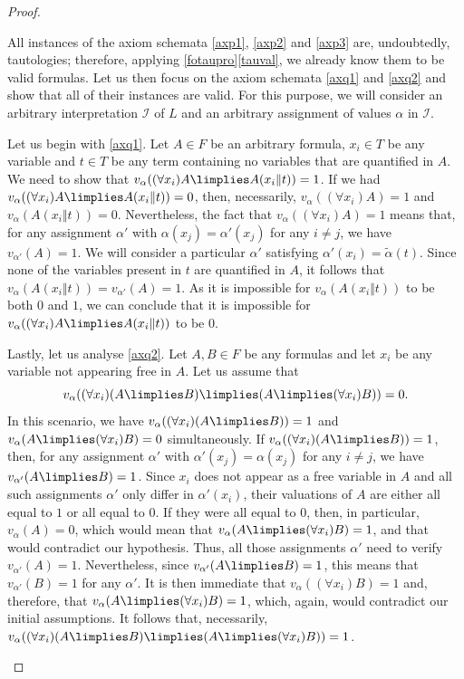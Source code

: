 \begin{proof}
\begin{parlist}
\item All instances of the axiom schemata \ref{axp1}, \ref{axp2} and \ref{axp3} are, undoubtedly, tautologies; therefore, applying \ref{fotaupro}\ref{tauval}, we already know them to be valid formulas.
Let us then focus on the axiom schemata \ref{axq1} and \ref{axq2} and show that all of their instances are valid.
For this purpose, we will consider an arbitrary interpretation $\mathcal{I}$ of $L$ and an arbitrary assignment of values $\alpha$ in $\mathcal{I}$.

Let us begin with \ref{axq1}. Let $A\in F$ be an arbitrary formula, $x_i\in T$ be any variable and $t\in T$ be any term containing no variables that are quantified in $A$.
We need to show that $v_\alpha( (\forall x_i) A \limplies A(x_i\Vert t)) = 1$.
If we had $v_\alpha( (\forall x_i) A \limplies A(x_i\Vert t)) = 0$, then, necessarily, $v_\alpha( (\forall x_i) A) = 1$ and $v_\alpha ( A(x_i\Vert t)) = 0$.
Nevertheless, the fact that $v_\alpha( (\forall x_i) A) = 1$ means that, for any assignment $\alpha'$ with $\alpha(x_j) = \alpha'(x_j)$ for any $i\neq j$, we have $v_{\alpha'}(A) = 1$.
We will consider a particular $\alpha'$ satisfying $\alpha'(x_i) = \tilde{\alpha}(t)$.
Since none of the variables present in $t$ are quantified in $A$, it follows that $v_\alpha(A(x_i\Vert t)) = v_{\alpha'}(A) = 1$. As it is impossible for $v_\alpha(A(x_i\Vert t))$ to be both $0$ and $1$, we can conclude that it is impossible for $v_\alpha( (\forall x_i) A \limplies A(x_i\Vert t) )$ to be $0$.

Lastly, let us analyse \ref{axq2}. Let $A,B\in F$ be any formulas and let $x_i$ be any variable not appearing free in $A$. Let us assume that
\[v_\alpha( (\forall x_i)(A\limplies B) \limplies (A\limplies (\forall x_i) B)) = 0.\]
In this scenario, we have $v_\alpha( (\forall x_i) (A\limplies B) ) = 1$ and $v_\alpha(A\limplies (\forall x_i) B) = 0$ simultaneously. 
If $v_\alpha( (\forall x_i) (A\limplies B)) = 1$, then, for any assignment $\alpha'$ with $\alpha'(x_j) = \alpha(x_j)$ for any $i\neq j$, we have $v_{\alpha'}( A \limplies B) = 1$.
Since $x_i$ does not appear as a free variable in $A$ and all such assignments $\alpha'$ only differ in $\alpha'(x_i)$, their valuations of $A$ are either all equal to $1$ or all equal to $0$.
If they were all equal to $0$, then, in particular, $v_\alpha(A) = 0$, which would mean that $v_\alpha(A\limplies (\forall x_i) B) = 1$, and that would contradict our hypothesis.
Thus, all those assignments $\alpha'$ need to verify $v_{\alpha'}(A) = 1$.
Nevertheless, since $v_{\alpha'}(A \limplies B) = 1$, this means that $v_{\alpha'}(B) = 1$ for any $\alpha'$.
It is then immediate that $v_\alpha( (\forall x_i) B) = 1$ and, therefore, that $v_\alpha( A\limplies (\forall x_i) B) = 1$, which, again, would contradict our initial assumptions.
It follows that, necessarily, $v_\alpha( (\forall x_i)(A\limplies B) \limplies (A\limplies (\forall x_i) B )) = 1$.


\end{parlist}
\end{proof}
